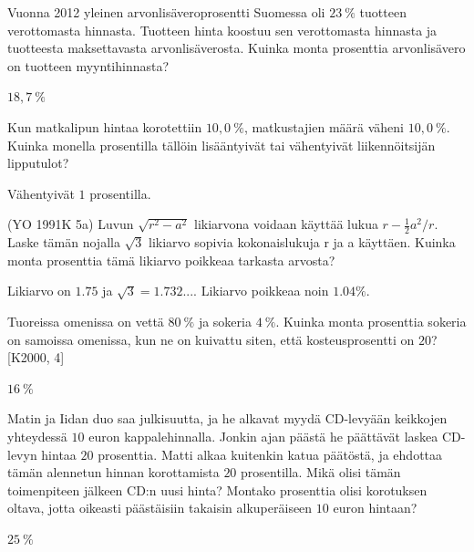 \begin{tehtavasivu}
\begin{tehtava}
    Vuonna 2012 yleinen arvonlisäveroprosentti Suomessa oli $23~\%$ tuotteen
    verottomasta hinnasta. Tuotteen hinta koostuu sen verottomasta hinnasta 
    ja tuotteesta maksettavasta arvonlisäverosta. Kuinka monta 
    prosenttia arvonlisävero on tuotteen myyntihinnasta?
    \begin{vastaus}
        $18,7~\%$
    \end{vastaus}
\end{tehtava}

\begin{tehtava}
    Kun matkalipun hintaa korotettiin $10,0~\%$, matkustajien määrä väheni $10,0~\%$.
    Kuinka monella prosentilla tällöin lisääntyivät tai vähentyivät liikennöitsijän 
    lipputulot?
    \begin{vastaus}
        Vähentyivät $1$ prosentilla.
    \end{vastaus}
\end{tehtava}


\begin{tehtava}
    (YO 1991K 5a) Luvun $\sqrt{r^2-a^2}$ likiarvona voidaan käyttää lukua $r-{\frac{1}{2}a^2}/r$. Laske tämän nojalla $\sqrt{3}$ likiarvo sopivia kokonaislukuja r ja a käyttäen. Kuinka monta prosenttia tämä likiarvo poikkeaa tarkasta arvosta?
    \begin{vastaus}
        Likiarvo on $1.75$ ja $\sqrt{3}=1.732...$. Likiarvo poikkeaa noin $1.04\%$.
    \end{vastaus}
\end{tehtava}

\begin{tehtava}
    Tuoreissa omenissa on vettä $80~\%$ ja sokeria $4~\%$. Kuinka monta prosenttia sokeria
    on samoissa omenissa, kun ne on kuivattu siten, että kosteusprosentti on $20$? [K2000, 4]
    \begin{vastaus}
        $16~\%$
    \end{vastaus}
\end{tehtava}

\begin{tehtava}
    Matin ja Iidan duo saa julkisuutta, ja he alkavat myydä CD-levyään keikkojen yhteydessä $10$ euron
    kappalehinnalla. Jonkin ajan päästä he päättävät laskea CD-levyn hintaa $20$ prosenttia. Matti alkaa
    kuitenkin katua päätöstä, ja ehdottaa tämän alennetun hinnan korottamista $20$ prosentilla. Mikä olisi
    tämän toimenpiteen jälkeen CD:n uusi hinta? Montako prosenttia olisi korotuksen oltava, jotta oikeasti
    päästäisiin takaisin alkuperäiseen $10$ euron hintaan?
    \begin{vastaus}
        $25~\%$
    \end{vastaus}
\end{tehtava}


\end{tehtavasivu}
